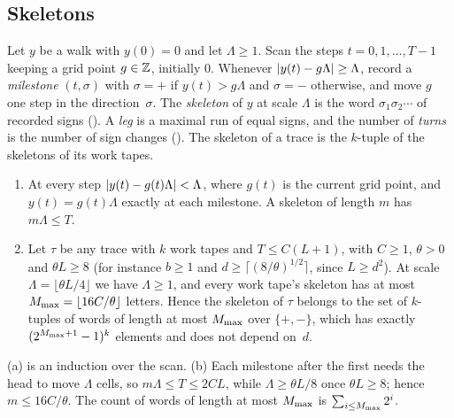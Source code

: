 \subsection{Skeletons}

\begin{definition}\label{def:skeleton}
Let $y$ be a walk with $y(0)=0$ and let $\Lambda\ge1$. Scan the steps $t=0,1,\dots,T-1$ keeping a grid point $g\in\mathbb{Z}$, initially
$0$. Whenever $\lvert y(t)-g\Lambda \rvert\ge\Lambda$, record a \emph{milestone} $(t,\sigma)$ with $\sigma=+$ if $y(t)>g\Lambda$ and
$\sigma=-$ otherwise, and move $g$ one step in the direction~$\sigma$. The \emph{skeleton} of $y$ at scale $\Lambda$ is the word
$\sigma_1\sigma_2\cdots$ of recorded signs (). A \emph{leg} is a maximal run of equal signs, and the number of
\emph{turns} is the number of sign changes (). The skeleton of a trace is the $k$-tuple of the skeletons of its
work tapes.
\end{definition}

\begin{lemma}\label{lem:finite}
\begin{enumerate}[label=(\alph*)]
\item At every step $\lvert y(t)-g(t)\Lambda \rvert<\Lambda$, where $g(t)$ is the current grid point, and $y(t)=g(t)\Lambda$ exactly at
each milestone. A skeleton of length $m$ has $m\Lambda\le T$.
\item Let $\tau$ be any trace with $k$ work tapes and $T\le C(L+1)$, with $C\ge1$, $\theta>0$ and $\theta L\ge8$ (for instance $b\ge1$
and $d\ge\lceil(8/\theta)^{1/2}\rceil$, since $L\ge d^2$).
At scale $\Lambda=\lfloor\theta L/4\rfloor$ we have $\Lambda\ge1$, and every work tape's skeleton has at most
$M_{\max}=\lfloor16C/\theta\rfloor$ letters. Hence the skeleton of $\tau$ belongs to the set of $k$-tuples of words of length at most
$M_{\max}$ over $\{+,-\}$, which has exactly $(2^{M_{\max}+1}-1)^k$ elements and does not depend on~$d$.
\end{enumerate}
\end{lemma}

\begin{outline}
(a) is an induction over the scan. (b) Each milestone after the first needs the head to move $\Lambda$ cells, so $m\Lambda\le T\le
2CL$, while $\Lambda\ge\theta L/8$ once $\theta L\ge8$; hence $m\le16C/\theta$. The count of words of length at most $M_{\max}$ is
$\sum_{i\le M_{\max}}2^i$.
\end{outline}

